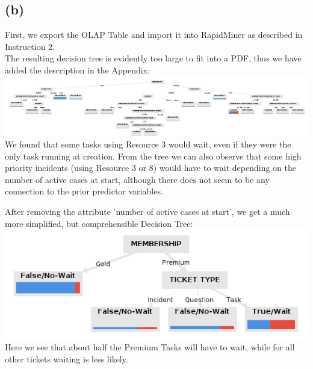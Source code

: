 \documentclass[../../main.tex]{subfiles}
\begin{document}
\subsection*{(b)}
First, we export the OLAP Table and import it into RapidMiner as described in Instruction 2.\\
The resulting decision tree is evidently too large to fit into a PDF, thus we have added the description in the Appendix:\\
\includegraphics[width=\columnwidth]{img/RapidMiner_b_Decision_Tree.png}\\
We found that some tasks using Resource 3 would wait, even if they were the only task running at creation. From the tree we can also observe that some high priority incidents (using Resource 3 or 8) would have to wait depending on the number of active cases at start, although there does not seem to be any connection to the prior predictor variables.

After removing the attribute 'number of active cases at start', we get a much more simplified, but comprehensible Decision Tree:\\
\includegraphics[width=0.8\columnwidth]{img/RapidMiner_b_Decision_Tree_filtered.png}\\
Here we see that about half the Premium Tasks will have to wait, while for all other tickets waiting is less likely.
\end{document}

